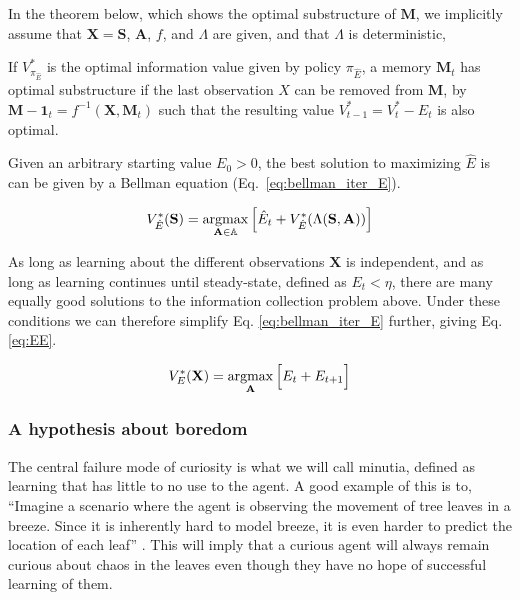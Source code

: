 In the theorem below, which shows the optimal substructure of $\mathbf{M}$, we implicitly assume that $\mathbf{X} = \mathbf{S}$, $\mathbf{A}$, $f$, and $\Lambda$ are given, and that $\Lambda$ is deterministic, 

\begin{theorem} \label{theorem:opt_sub} 
   If $V^*_{\pi_{\hat E}}$ is the optimal information value given by policy $\pi_{\hat E}$, a memory $\mathbf{M}_t$ has optimal substructure if the last observation $X$ can be removed from $\mathbf{M}$, by $\mathbf{M-1}_{t} = f^{-1}(\mathbf{X}, \mathbf{M}_t)$ such that the resulting value $V^*_{t-1} = V^*_{t} - E_{t}$ is also optimal. 
\end{theorem}

Given an arbitrary starting value $E_0 > 0$, the best solution to maximizing $\hat E$ is can be given by a Bellman equation (Eq.~\ref{eq:bellman_iter_E}).

\begin{equation} 
	\label{eq:bellman_iter_E}
	V^*_{\hat E}(\mathbf{S}) = \operatorname*{argmax}_{\mathbf{A} \in \mathbb{A}} \Big [ \hat E_{t}  + V^*_{\hat E}(\Lambda(\mathbf{S},\mathbf{A})) \Big ]
\end{equation}

As long as learning about the different observations $\mathbf{X}$ is independent, and as long as learning continues until steady-state, defined as $E_t < \eta$, there are many equally good solutions to the information collection problem above. Under these conditions we can therefore simplify Eq. \ref{eq:bellman_iter_E} further, giving Eq. \ref{eq:EE}. 

\begin{equation}
	\label{eq:EE} 
	V_E^{*}(\mathbf{X}) = \operatorname*{argmax}_{\mathbf{A}} \Big [ E_t + E_{t+1} \Big ]
\end{equation}

\subsubsection*{A hypothesis about boredom}
The central failure mode of curiosity is what we will call minutia, defined as learning that has little to no use to the agent. A good example of this is to, ``Imagine a scenario where the agent is observing the movement of tree leaves in a breeze. Since it is inherently hard to model breeze, it is even harder to predict the location of each leaf'' \cite{Pathak2017}. This will imply that a curious agent will always remain curious about chaos in the leaves even though they have no hope of successful learning of them.

